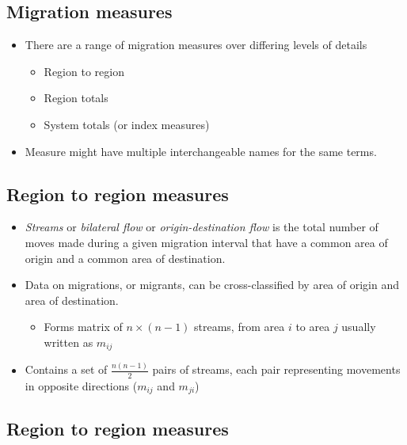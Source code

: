 \documentclass[
]{book}
\providecommand{\tightlist}{%
  \setlength{\itemsep}{0pt}\setlength{\parskip}{0pt}}
\begin{document}
\hypertarget{migration-measures}{%
\subsection{Migration measures}\label{migration-measures}}

\begin{itemize}
\tightlist
\item
  There are a range of migration measures over differing levels of details

  \begin{itemize}
  \tightlist
  \item
    Region to region
  \item
    Region totals
  \item
    System totals (or index measures)
  \end{itemize}
\item
  Measure might have multiple interchangeable names for the same terms.
\end{itemize}

\hypertarget{region-to-region-measures}{%
\subsection{Region to region measures}\label{region-to-region-measures}}

\begin{itemize}
\tightlist
\item
  \emph{Streams} or \emph{bilateral flow} or \emph{origin-destination flow} is the total number of moves made during a given migration interval that have a common area of origin and a common area of destination.
\item
  Data on migrations, or migrants, can be cross-classified by area of origin and area of destination.

  \begin{itemize}
  \tightlist
  \item
    Forms matrix of \(n \times (n-1)\) streams, from area \(i\) to area \(j\) usually written as \(m_{ij}\)
  \end{itemize}
\item
  Contains a set of \(\frac{n(n -1)}{2}\) pairs of streams, each pair representing movements in opposite directions (\(m_{ij}\) and \(m_{ji}\))
\end{itemize}

\hypertarget{region-to-region-measures-1}{%
\subsection{Region to region measures}\label{region-to-region-measures-1}}
\end{document}
